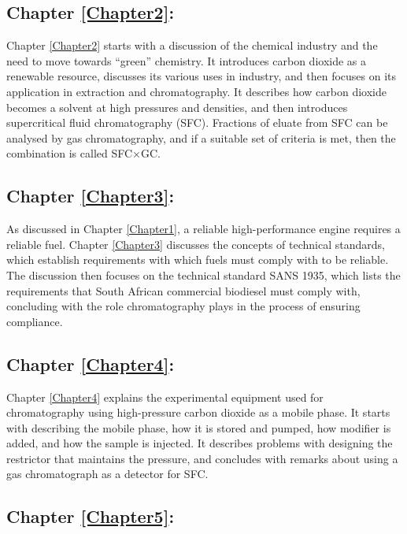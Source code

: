 \subsection{Chapter \ref{Chapter2}:  }

Chapter \ref{Chapter2} starts with a discussion of the chemical industry and the
need to move towards ``green'' chemistry. It introduces carbon dioxide as a
renewable resource, discusses its various uses in industry, and then focuses on
its application in extraction and chromatography. It describes how carbon
dioxide becomes a solvent at high pressures and densities, and then introduces
supercritical fluid chromatography (SFC). Fractions of eluate from SFC can be
analysed by gas chromatography, and if a suitable set of criteria is met, then
the combination is called SFC×GC.

\subsection{Chapter \ref{Chapter3}:  }

As discussed in Chapter \ref{Chapter1}, a reliable high-performance engine
requires a reliable fuel. Chapter \ref{Chapter3} discusses the concepts of
technical standards, which establish requirements with which fuels must comply
with to be reliable. The discussion then focuses on the technical standard SANS
1935, which lists the requirements that South African commercial biodiesel must
comply with, concluding with the role chromatography plays in the process of
ensuring compliance.

\subsection{Chapter \ref{Chapter4}:  }
 
Chapter \ref{Chapter4} explains the experimental equipment used for
chromatography using high-pressure carbon dioxide as a mobile phase. It starts
with describing the mobile phase, how it is stored and pumped, how modifier is
added, and how the sample is injected. It describes problems with designing the
restrictor that maintains the pressure, and concludes with remarks about using a
gas chromatograph as a detector for SFC. 

\subsection{Chapter \ref{Chapter5}:  }

